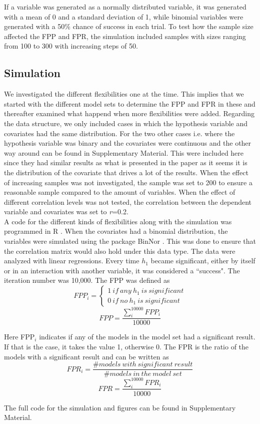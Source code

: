 If a variable was generated as a normally distributed variable, it was generated with a mean of 0 and a standard deviation of 1, while binomial variables were generated with a 50\% chance of success in each trial. To test how the sample size affected the FPP and FPR, the simulation included samples with sizes ranging from 100 to 300 with increasing steps of 50. 

\subsection{Simulation}
We investigated the different flexibilities one at the time. This implies that we started with the different model sets to determine the FPP and FPR in these and thereafter examined what happend when more flexibilities were added. Regarding the data structure, we only included cases in which the hypothesis variable and covariates had the same distribution. For the two other cases i.e. where the hypothesis variable was binary and the covariates were continuous and the other way around can be found in Supplementary Material. This were included here since they had similar results as what is presented in the paper as it seems it is the distribution of the covariate that drives a lot of the results. When the effect of increasing samples was not investigated, the sample was set to 200 to ensure a reasonable sample compared to the amount of variables. When the effect of different correlation levels was not tested, the correlation between the dependent variable and covariates was set to \textit{r}=0.2.\\

A code for the different kinds of flexibilities along with the simulation was programmed in R \citep{Team2018}. When the covariates had a binomial distribution, the variables were simulated using the package BinNor \citep{Demirtas2014}. This was done to ensure that the correlation matrix would also hold under this data type. The data were analyzed with linear regressions. Every time $h_1$ became significant, either by itself or in an interaction with another variable, it was considered a “success". The iteration number was 10,000. The FPP was defined as \\

\[FPP_i=\left. \left\{\begin{array}{c}
1\ if\ any\ h_1\ is\ significant \\ 
0\ if\ no\ h_1\ is\ significant\  \end{array}
\right.\] 
\[FPP=\frac{\sum^{10000}_i{FPP_i}}{10000}\] 


Here FPP${}_{i}$ indicates if any of the models in the model set had a significant result. If that is the case, it takes the value 1, otherwise 0. The FPR is the ratio of the models with a significant result and can be written as \\

\[FPR_i=\frac{\#models\ with\ significant\ result}{\#models\ in\ the\ model\ set}\] 
\[FPR=\frac{\sum^{10000}_i{FPR_i}}{10000}\] 


The full code for the simulation and figures can be found in Supplementary Material. 

